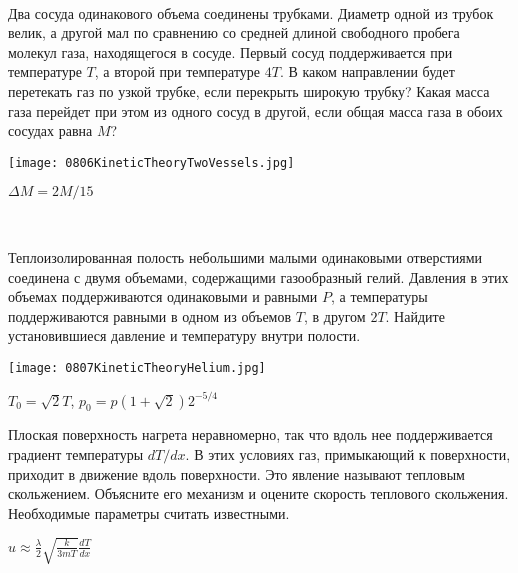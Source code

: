 \begin{ex}
\hspace{0pt} \\
\begin{minipage}{.65\textwidth}
Два сосуда одинакового объема соединены трубками. Диаметр одной из трубок велик, 
а другой мал по сравнению со средней длиной свободного пробега молекул газа, находящегося в сосуде. 
Первый сосуд поддерживается при температуре $T$, а второй при температуре $4T$. 
В каком направлении будет перетекать газ по узкой трубке, если перекрыть широкую трубку? 
Какая масса газа перейдет при этом из одного сосуд в другой, если общая масса газа в обоих сосудах равна $M$?
\end{minipage}
\begin{minipage}{.35\textwidth}
\centering
\texttt{[image: 0806KineticTheoryTwoVessels.jpg]}
\end{minipage}
\begin{ans}
$\Delta M = 2M/15$
\end{ans}
\end{ex}

\begin{ex}
\hspace{0pt} \\
\begin{minipage}{.65\textwidth}
Теплоизолированная полость небольшими малыми одинаковыми отверстиями соединена с двумя объемами, содержащими газообразный гелий. 
Давления в этих объемах поддерживаются одинаковыми и равными $P$, а температуры поддерживаются равными в одном из объемов $T$, в другом $2T$. 
Найдите установившиеся давление и температуру внутри полости.
\end{minipage}
\begin{minipage}{.35\textwidth}
\centering
\texttt{[image: 0807KineticTheoryHelium.jpg]}
\end{minipage}
\begin{ans}
$T_0 = \sqrt{2}T$, $p_0=p(1+\sqrt{2})2^{-5/4}$
\end{ans}
\end{ex}

\begin{ex}
Плоская поверхность нагрета неравномерно, так что вдоль нее поддерживается градиент температуры $dT/dx$. 
В этих условиях газ, примыкающий к поверхности, приходит в движение вдоль поверхности. Это явление называют тепловым скольжением. 
Объясните его механизм и оцените скорость теплового скольжения. Необходимые параметры считать известными.
\begin{ans}
$u \approx \frac{\lambda}{2}\sqrt{\frac{k}{3mT}}\frac{dT}{dx}$
\end{ans}
\end{ex}

